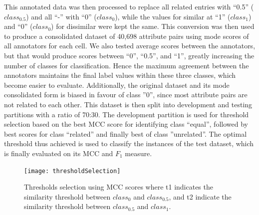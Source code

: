 \documentclass{ieeeaccess}
\begin{document}
This annotated data was then processed to replace all related entries with ``0.5'' ($class_{0.5}$) and all ``-'' with ``0'' ($class_{0}$), while the values for similar at ``1'' ($class_{1}$) and ``0'' ($class_{0}$) for dissimilar were kept the same. This conversion was then used to produce a consolidated dataset of 40,698 attribute pairs using mode scores of all annotators for each cell. We also tested average scores between the annotators, but that would produce scores between ``0'', ``0.5'', and ``1'', greatly increasing the number of classes for classification. Hence the maximum agreement between the annotators maintains the final label values within these three classes, which become easier to evaluate. Additionally, the original dataset and its mode consolidated form is biased in favour of class ''0'', since most attribute pairs are not related to each other.
This dataset is then split into development and testing partitions with a ratio of 70:30. The development partition is used for threshold selection based on the best MCC score for identifying class ``equal'', followed by best scores for class ``related'' and finally best of class ''unrelated''. The optimal threshold thus achieved is used to classify the instances of the test dataset, which is finally evaluated on its MCC and $F_1$ measure.

\begin{figure}[t!]
	\centering
	\texttt{[image: thresholdSelection]}
	\caption{Thresholds selection using MCC scores where t1 indicates the similarity threshold between $class_0$ and $class_{0.5}$, and t2 indicate the similarity threshold between $class_{0.5}$ and $class_1$.}
	\label{fig:thresholdSelection}
\end{figure}
\end{document}
